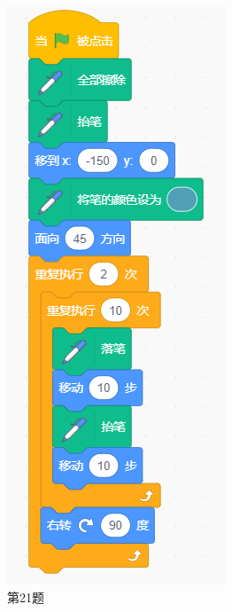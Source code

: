 \documentclass[10pt, a4paper]{article}
\begin{document}
\begin{enumerate}
\begin{figure}[htbp]
\begin{minipage}[t]{.18\textwidth}
                \caption*{第21题}
            \end{minipage}
            \begin{minipage}[t]{.14\textwidth}
                \includegraphics[width=\textwidth]{22.png}

\end{minipage}
\end{figure}
\end{enumerate}
\end{document}

